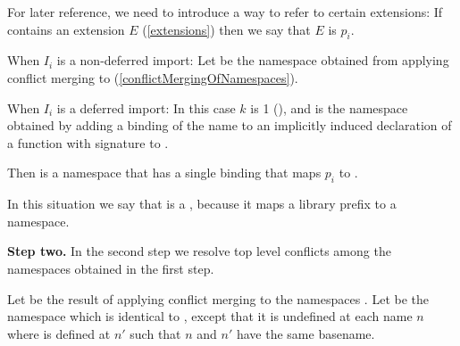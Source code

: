 \documentclass[makeidx]{article}
\begin{document}
{\LMHash{}%
For later reference, we need to introduce a way to refer to certain extensions:
If  contains an extension $E$
(\ref{extensions})
then we say that $E$ is
$p_i$.

\LMHash{}%
When $I_i$ is a non-deferred import:
Let  be the namespace obtained from applying
conflict merging to
(\ref{conflictMergingOfNamespaces}).

\LMHash{}%
When $I_i$ is a deferred import:
In this case $k$ is 1
(),
and  is the namespace obtained by
adding a binding of the name 
to an implicitly induced declaration of a function with signature
to .

\LMHash{}%
Then  is a namespace that has
a single binding that maps $p_i$ to .

\LMHash{}%
In this situation we say that  is a
,
because it maps a library prefix to a namespace.

\EndCase

\LMHash{}%
{\bf Step two.}
In the second step we resolve top level conflicts
among the namespaces obtained in the first step.

\LMHash{}%
Let  be the result of applying
conflict merging to the namespaces
.
Let 
be the namespace which is identical to ,
except that it is undefined at each name $n$ where
 is defined at $n'$
such that $n$ and $n'$ have the same basename.

}
\end{document}
